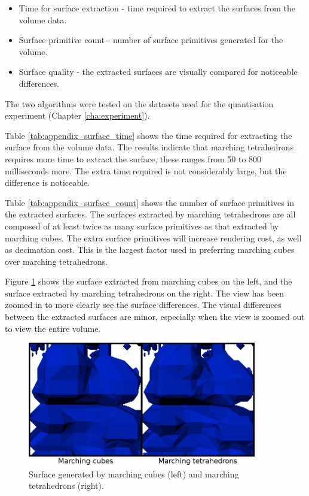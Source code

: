 \begin{itemize}

  \item Time for surface extraction - time required to extract the surfaces
  from the volume data.

  \item Surface primitive count - number of surface primitives generated for
  the volume.

  \item Surface quality - the extracted surfaces are visually compared for
  noticeable differences.

\end{itemize}

The two algorithms were tested on the datasets used for the quantisation
experiment (Chapter \ref{cha:experiment}).

Table \ref{tab:appendix_surface_time} shows the time required for extracting
the surface from the volume data. The results indicate that marching
tetrahedrons requires more time to extract the surface, these ranges from 50 to
800 milliseconds more. The extra time required is not considerably large, but
the difference is noticeable.

Table \ref{tab:appendix_surface_count} shows the number of surface primitives
in the extracted surfaces. The surfaces extracted by marching tetrahedrons are
all composed of at least twice as many surface primitives as that extracted by
marching cubes. The extra surface primitives will increase rendering cost, as
well as decimation cost. This is the largest factor used in preferring marching
cubes over marching tetrahedrons.

Figure \ref{fig:implementation_compare} shows the surface extracted from
marching cubes on the left, and the surface extracted by marching tetrahedrons
on the right. The view has been zoomed in to more clearly see the surface
differences. The visual differences between the extracted surfaces are minor,
especially when the view is zoomed out to view the entire volume.

\begin{figure}
  \begin{center}
    \includegraphics[width=100mm]{surface_compare}
  \end{center}
  \caption{Surface generated by marching cubes (left) and marching tetrahedrons
  (right).}
  \label{fig:implementation_compare}
\end{figure}

